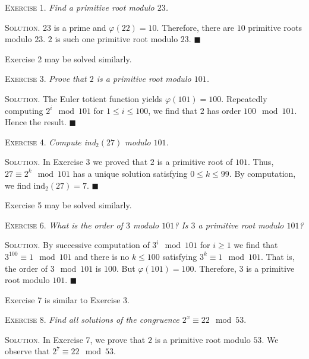 \documentclass[11pt, leqno]{article}
\newcommand{\done}{\ensuremath{\blacksquare}}
\begin{document}
\textsc{Exercise 1}. \emph{Find a primitive root modulo $23$.}

\textsc{Solution}. 23 is a prime and $\varphi(22) = 10$. Therefore, there are $10$ primitive roots modulo $23$. $2$ is such one primitive root modulo $23$. \done

Exercise 2 may be solved similarly.

\textsc{Exercise 3}. \emph{Prove that $2$ is a primitive root modulo $101$.}

\textsc{Solution}. The Euler totient function yields $\varphi(101) = 100$. Repeatedly computing $2^i \mod 101$ for $1\leq i \leq 100$, we find that $2$ has order $100 \mod 101$. Hence the result. \done

\textsc{Exercise 4}. \emph{Compute \emph{ind}$_2(27)$ modulo $101$.}

\textsc{Solution}. In Exercise 3 we proved that $2$ is a primitive root of $101$. Thus, $27 \equiv 2^k \mod 101$ has a unique solution satisfying $0\leq k \leq 99$. By computation, we find ind$_2(27) = 7$. \done

Exercise 5 may be solved similarly.

\textsc{Exercise 6}. \emph{What is the order of $3$ modulo $101$? Is $3$ a primitive root modulo $101$?}

\textsc{Solution}. By successive computation of $3^i \mod 101$ for $i\geq 1$ we find that $3^{100}\equiv 1 \mod 101$ and there is no $k\leq 100$ satisfying $3^k \equiv 1 \mod 101$. That is, the order of $3 \mod 101$ is $100$. But $\varphi(101) = 100$. Therefore, $3$ is a primitive root modulo $101$. \done

Exercise 7 is similar to Exercise 3.

\textsc{Exercise 8}. \emph{Find all solutions of the congruence $2^x \equiv 22 \mod 53$}.

\textsc{Solution}. In Exercise 7, we prove that $2$ is a primitive root modulo $53$. We observe that $2^7 \equiv 22 \mod 53$. 
\end{document}
